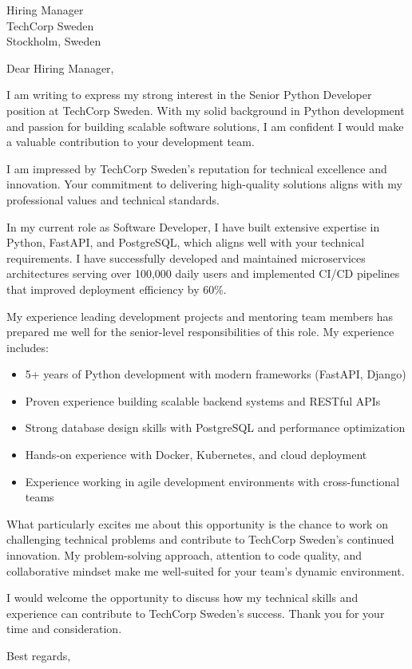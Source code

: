 \documentclass[11pt,a4paper]{letter}
\begin{document}
\begin{letter}{Hiring Manager \\ TechCorp Sweden \\ Stockholm, Sweden}

\opening{Dear Hiring Manager,}

I am writing to express my strong interest in the Senior Python Developer position at TechCorp Sweden. With my solid background in Python development and passion for building scalable software solutions, I am confident I would make a valuable contribution to your development team.

I am impressed by TechCorp Sweden's reputation for technical excellence and innovation. Your commitment to delivering high-quality solutions aligns with my professional values and technical standards.

In my current role as Software Developer, I have built extensive expertise in Python, FastAPI, and PostgreSQL, which aligns well with your technical requirements. I have successfully developed and maintained microservices architectures serving over 100,000 daily users and implemented CI/CD pipelines that improved deployment efficiency by 60\%.

My experience leading development projects and mentoring team members has prepared me well for the senior-level responsibilities of this role. My experience includes:

\begin{itemize}
\item 5+ years of Python development with modern frameworks (FastAPI, Django)
\item Proven experience building scalable backend systems and RESTful APIs
\item Strong database design skills with PostgreSQL and performance optimization
\item Hands-on experience with Docker, Kubernetes, and cloud deployment
\item Experience working in agile development environments with cross-functional teams
\end{itemize}

What particularly excites me about this opportunity is the chance to work on challenging technical problems and contribute to TechCorp Sweden's continued innovation. My problem-solving approach, attention to code quality, and collaborative mindset make me well-suited for your team's dynamic environment.

I would welcome the opportunity to discuss how my technical skills and experience can contribute to TechCorp Sweden's success. Thank you for your time and consideration.

\closing{Best regards,}

\end{letter}
\end{document}

